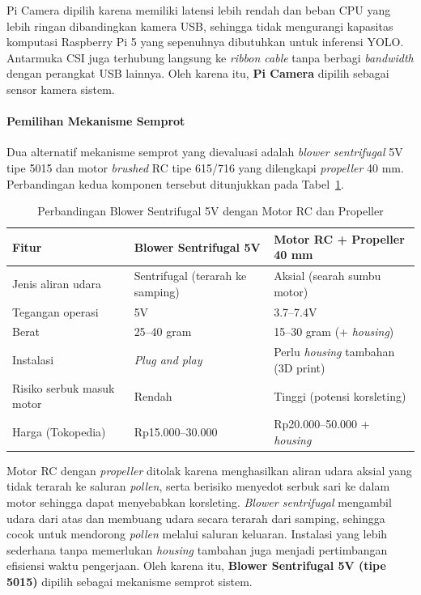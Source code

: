 Pi Camera dipilih karena memiliki latensi lebih rendah dan beban CPU yang lebih ringan dibandingkan kamera USB, sehingga tidak mengurangi kapasitas komputasi Raspberry Pi 5 yang sepenuhnya dibutuhkan untuk inferensi YOLO. Antarmuka CSI juga terhubung langsung ke \emph{ribbon cable} tanpa berbagi \emph{bandwidth} dengan perangkat USB lainnya. Oleh karena itu, \textbf{Pi Camera} dipilih sebagai sensor kamera sistem.

\paragraph{Pemilihan Mekanisme Semprot}

Dua alternatif mekanisme semprot yang dievaluasi adalah \emph{blower sentrifugal} 5V tipe 5015 dan motor \emph{brushed} RC tipe 615/716 yang dilengkapi \emph{propeller} 40 mm. Perbandingan kedua komponen tersebut ditunjukkan pada Tabel~\ref{tab:perbandingan-blower}.

\begin{table}[H]
\centering
\caption{Perbandingan Blower Sentrifugal 5V dengan Motor RC dan Propeller}
\label{tab:perbandingan-blower}
\begin{tabular}{|p{3.5cm}|p{5.5cm}|p{5.5cm}|}
\hline
\textbf{Fitur} & \textbf{Blower Sentrifugal 5V} & \textbf{Motor RC + Propeller 40 mm} \\
\hline
Jenis aliran udara & Sentrifugal (terarah ke samping) & Aksial (searah sumbu motor) \\
\hline
Tegangan operasi & 5V & 3.7--7.4V \\
\hline
Berat & 25--40 gram & 15--30 gram (+ \emph{housing}) \\
\hline
Instalasi & \emph{Plug and play} & Perlu \emph{housing} tambahan (3D print) \\
\hline
Risiko serbuk masuk motor & Rendah & Tinggi (potensi korsleting) \\
\hline
Harga (Tokopedia) & Rp15.000--30.000 & Rp20.000--50.000 + \emph{housing} \\
\hline
\end{tabular}
\end{table}

Motor RC dengan \emph{propeller} ditolak karena menghasilkan aliran udara aksial yang tidak terarah ke saluran \emph{pollen}, serta berisiko menyedot serbuk sari ke dalam motor sehingga dapat menyebabkan korsleting. \emph{Blower sentrifugal} mengambil udara dari atas dan membuang udara secara terarah dari samping, sehingga cocok untuk mendorong \emph{pollen} melalui saluran keluaran. Instalasi yang lebih sederhana tanpa memerlukan \emph{housing} tambahan juga menjadi pertimbangan efisiensi waktu pengerjaan. Oleh karena itu, \textbf{Blower Sentrifugal 5V (tipe 5015)} dipilih sebagai mekanisme semprot sistem.

